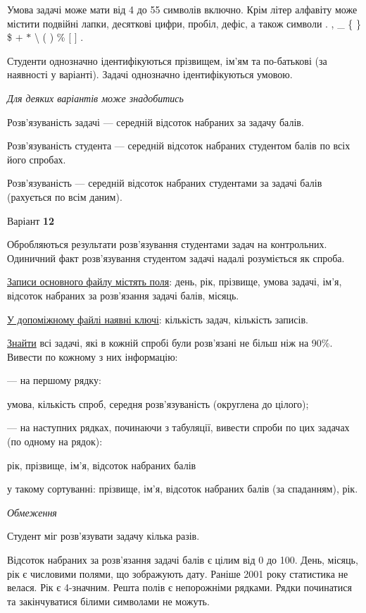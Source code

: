 \documentclass[11pt, ukrainian]{article}
\begin{document}
Умова задачі може мати від 4 до 55 символів включно.
Крім літер алфавіту може містити подвійні лапки, десяткові цифри, пробіл, дефіс,
а також символи . , \_ \{ \} \$ $+$ $*$ {\textbackslash} ( ) \% $[$ $]$ .

Студенти однозначно ідентифікуються прізвищем, ім’ям та по-батькові (за наявності у варіанті).
Задачі однозначно ідентифікуються умовою.

\bigskip\textit{Для деяких варіантів може знадобитись}

Розв'язуваність задачі --- середній відсоток набраних за задачу балів.

Розв'язуваність студента --- середній відсоток набраних студентом балів по всіх його спробах.

Розв'язуваність --- середній відсоток набраних студентами за задачі балів (рахується по всім даним).


\par
\newpage
{\center Варіант  \No \textbf { 12 }\par}
\bigskip
Обробляються результати розв’язування студентами задач на контрольних.
Одиничний факт роз\-в’я\-зу\-вання студентом задачі надалі розуміється як спроба.

\underline{Записи основного файлу містять поля}: день, рік, прізвище, умова задачі, ім’я, відсоток набраних за розв’язання задачі балів, місяць.

\underline{У допоміжному файлі наявні ключі}: кількість задач, кількість записів.

\underline{Знайти} всі задачі, які в кожній спробі були розв’язані не більш ніж на 90\%. Вивести по кожному з них інформацію:\par
{\noindent}--- на першому рядку:\par
умова, кількість спроб, середня розв’язуваність (округлена до цілого);

{\noindent}--- на наступних рядках, починаючи з табуляції, вивести спроби по цих задачах (по одному на рядок):\par
рік, прізвище, ім’я, відсоток набраних балів

{\noindent}у такому сортуванні: прізвище, ім’я, відсоток набраних балів (за спаданням), рік.


\bigskip\textit{Обмеження}

Студент міг розв’язувати задачу кілька разів.

Відсоток набраних за розв’язання задачі балів є цілим від 0 до 100.
День, місяць, рік є числовими полями, що зображують дату.
Раніше 2001 року статистика не велася. Рік є 4-значним.
Решта полів є непорожніми рядками.
Рядки починатися та закінчуватися білими символами не можуть.
\end{document}
